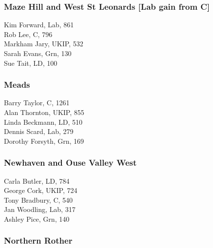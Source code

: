 \documentclass[a4paper,openany,10pt]{book}
\begin{document}
\subsubsection*{Maze Hill and West St Leonards \hspace*{\fill}\nolinebreak[1]%
\enspace\hspace*{\fill}
[Lab gain from C]}



Kim Forward, Lab, 861\\
Rob Lee, C, 796\\
Markham Jary, UKIP, 532\\
Sarah Evans, Grn, 130\\
Sue Tait, LD, 100\\


\subsubsection*{Meads}



Barry Taylor, C, 1261\\
Alan Thornton, UKIP, 855\\
Linda Beckmann, LD, 510\\
Dennis Scard, Lab, 279\\
Dorothy Forsyth, Grn, 169\\


\subsubsection*{Newhaven and Ouse Valley West}



Carla Butler, LD, 784\\
George Cork, UKIP, 724\\
Tony Bradbury, C, 540\\
Jan Woodling, Lab, 317\\
Ashley Pice, Grn, 140\\


\subsubsection*{Northern Rother}
\end{document}

